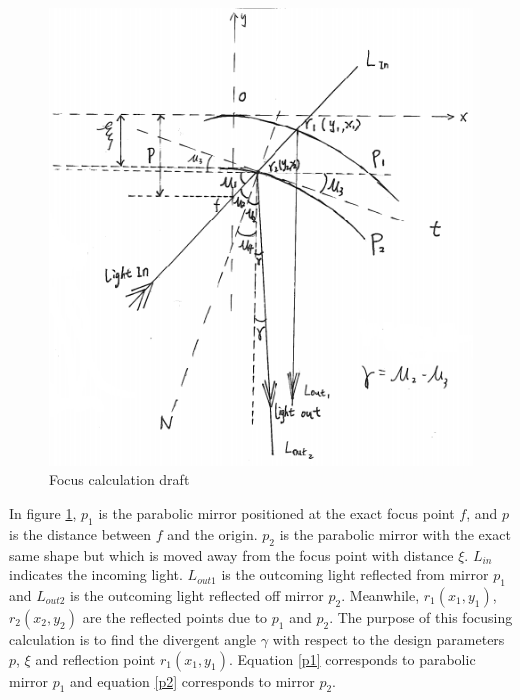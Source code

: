 \begin{figure}[ht!]
\centering
\includegraphics[scale = 1.1]{chapters/img/focus.png}
\caption{Focus calculation draft}
\label{fig:focus}
\end{figure}

In figure \ref{fig:focus}, $p_{1}$ is the parabolic mirror positioned at the exact focus point $f$, and $p$ is the distance between $f$ and the origin. $p_{2}$ is the parabolic mirror with the exact same shape but which is moved away from the focus point with distance $\xi$. $L_{in}$ indicates the incoming light. $L_{out1}$ is the outcoming light reflected from mirror $p_{1}$ and $L_{out2}$ is the outcoming light reflected off mirror $p_{2}$. Meanwhile, $r_{1}(x_{1}, y_{1})$, $r_{2}(x_{2}, y_{2})$ are the reflected points due to $p_{1}$ and $p_{2}$. The purpose of this focusing calculation is to find the divergent angle $\gamma$ with respect to the design parameters $p$, $\xi$ and reflection point $r_{1}(x_{1}, y_{1}) $\cite{parabolic_wiki}. Equation \ref{p1} corresponds to parabolic mirror $p_{1}$ and equation \ref{p2} corresponds to mirror $p_{2}$. 

